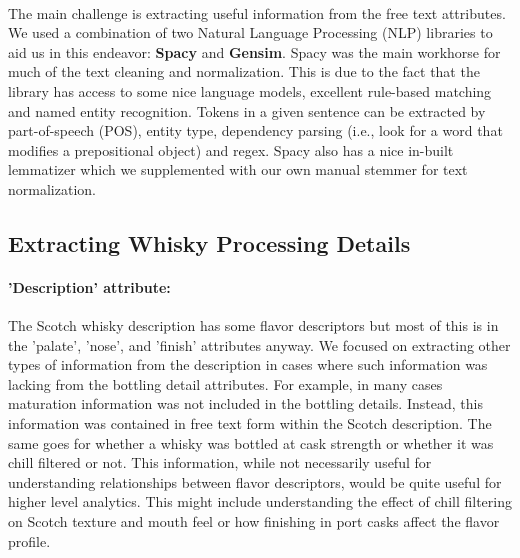 \documentclass{article}
\begin{document}
 	\paragraph{} The main challenge is extracting useful information from the free text attributes. We used a combination of two Natural Language Processing (NLP) libraries to aid us in this endeavor: \textbf{Spacy} and \textbf{Gensim}. Spacy was the main workhorse for much of the text cleaning and normalization. This is due to the fact that the library has access to some nice language models, excellent rule-based matching and named entity recognition. Tokens in a given sentence can be extracted by part-of-speech (POS), entity type, dependency parsing (i.e., look for a word that modifies a prepositional object) and regex.
 	Spacy also has a nice in-built lemmatizer which we supplemented with our own manual stemmer for text normalization.  
 	\subsection{Extracting Whisky Processing Details}
 	\paragraph{'Description' attribute:} The Scotch whisky description has some flavor descriptors but most of this is in the 'palate', 'nose', and 'finish' attributes anyway. We focused on extracting other types of information from the description in cases where such information was lacking from the bottling detail attributes. For example, in many cases maturation information was not included in the bottling details. Instead, this information was contained in free text form within the Scotch description. The same goes for whether a whisky was bottled at cask strength or whether it was chill filtered or not. This information, while not necessarily useful for understanding relationships between flavor descriptors, would be quite useful for higher level analytics. This might include understanding the effect of chill filtering on Scotch texture and mouth feel or how finishing in port casks affect the flavor profile.
\end{document}
